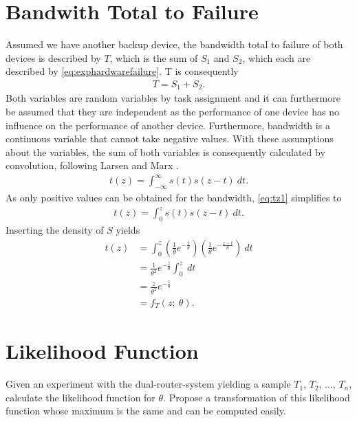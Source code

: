\section{Bandwith Total to Failure}
Assumed we have another backup device, the bandwidth total to failure of both devices is described by $T$, which is the sum of $S_1$ and $S_2$, which each are described by \eqref{eq:exphardwarefailure}. T is consequently
\begin{equation}
\begin{split}
T = S_1 + S_2.
\end{split}
\label{eq:T}
\end{equation}
Both variables are random variables by task assignment and it can furthermore be assumed that they are independent as the performance of one device has no influence on the performance of another device. Furthermore, bandwidth is a continuous variable that cannot take negative values. With these assumptions about the variables, the sum of both variables is consequently calculated by convolution, following Larsen and Marx \cite[Theorem~3.8.3]{larsen2005introduction}.
\begin{equation}
\begin{split}
t(z) = \int_{-\infty}^\infty s(t)s(z-t)~dt.
\end{split}
\label{eq:tz1}
\end{equation}
As only positive values can be obtained for the bandwidth, \eqref{eq:tz1} simplifies to 
\begin{equation}
\begin{split}
t(z) = \int_{0}^zs(t)s(z-t)~dt.
\end{split}
\label{eq:tz2}
\end{equation}
Inserting the density of $S$ yields
\begin{equation}
\begin{split}
t(z) 
&= \int_{0}^z \left(\frac{1}{\theta} e^{-\frac{t}{\theta}}\right)
\left(\frac{1}{\theta} e^{-\frac{z-t}{\theta}}\right)~dt\\
&= \frac{1}{\theta^2} e^{-\frac{z}{\theta}}\int_{0}^z~dt\\
&= \frac{z}{\theta^2} e^{-\frac{z}{\theta}}\\
&= f_T(z;~\theta).
\end{split}
\label{eq:tz3}
\end{equation}

\section{Likelihood Function}
Given an experiment with the dual-router-system yielding a sample $T_1$, $T_2$, ..., $T_n$, calculate the likelihood function for $\theta$. Propose a transformation of this likelihood function whose maximum is the same and can be computed easily.

